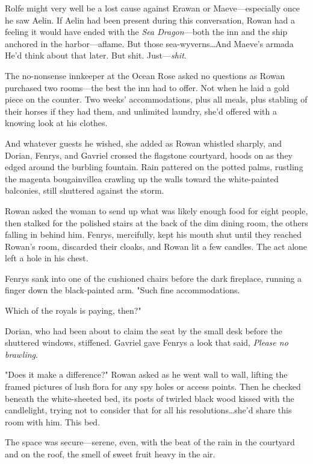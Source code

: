 Rolfe might very well be a lost cause against Erawan or Maeve---especially once he saw Aelin.
If Aelin had been present during this conversation, Rowan had a feeling it would have ended with the \emph{Sea Dragon}---both the inn and the ship anchored in the harbor---aflame.
But those sea-wyverns\ldots And Maeve's armada  He'd think about that later.
But shit.
Just---\emph{shit}.

The no-nonsense innkeeper at the Ocean Rose asked no questions as Rowan purchased two rooms---the best the inn had to offer.
Not when he laid a gold piece on the counter.
Two weeks' accommodations, plus all meals, plus stabling of their horses if they had them, and unlimited laundry, she'd offered with a knowing look at his clothes.

And whatever guests he wished, she added as Rowan whistled sharply, and Dorian, Fenrys, and Gavriel crossed the flagstone courtyard, hoods on as they edged around the burbling fountain.
Rain pattered on the potted palms, rustling the magenta bougainvillea crawling up the walls toward the white-painted balconies, still shuttered against the storm.

Rowan asked the woman to send up what was likely enough food for eight people, then stalked for the polished stairs at the back of the dim dining room, the others falling in behind him.
Fenrys, mercifully, kept his mouth shut until they reached Rowan's room, discarded their cloaks, and Rowan lit a few candles.
The act alone left a hole in his chest.

Fenrys sank into one of the cushioned chairs before the dark fireplace, running a finger down the black-painted arm.
"Such fine accommodations.

Which of the royals is paying, then?"

Dorian, who had been about to claim the seat by the small desk before the shuttered windows, stiffened.
Gavriel gave Fenrys a look that said,
\emph{Please no brawling}.

"Does it make a difference?"
Rowan asked as he went wall to wall, lifting the framed pictures of lush flora for any spy holes or access points.
Then he checked beneath the white-sheeted bed, its posts of twirled black wood kissed with the candlelight, trying not to consider that for all his resolutions\ldots she'd share this room with him.
This bed.

The space was secure---serene, even, with the beat of the rain in the courtyard and on the roof, the smell of sweet fruit heavy in the air.

